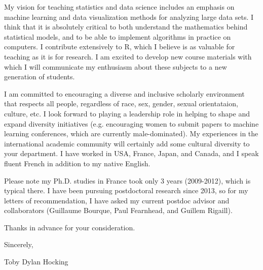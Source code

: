 \documentclass{article}
\begin{document}
My vision for teaching 
statistics 
and data science
includes an emphasis on machine
learning and data visualization methods for analyzing large data
sets. I think that it is absolutely critical to both understand the
mathematics behind statistical models, and to be able to implement
algorithms in practice on computers. I contribute extensively to R,
which I believe is as valuable for teaching as it is for research. I
am excited to develop new course materials with which I will
communicate my enthusiasm about these subjects to a new generation of
students.

I am committed to encouraging a diverse and inclusive scholarly
environment that respects all people, regardless of race, sex, gender,
sexual orientataion, culture, etc. I look forward to playing a
leadership role in helping to shape and expand diversity initiatives
(e.g. encouraging women to submit papers to machine learning
conferences, which are currently male-dominated). My experiences in
the international academic community will certainly add some cultural
diversity to your department. I have worked in USA, France, Japan, and
Canada, and I speak fluent French in addition to my native English. 


Please note my Ph.D. studies in France took only 3
years (2009-2012), which is typical there.
I have been pursuing postdoctoral research since 2013, so for my
letters of recommendation, I have asked my current postdoc advisor and
collaborators (Guillaume Bourque, Paul Fearnhead, and Guillem
Rigaill). 

Thanks in advance for your consideration.

Sincerely,


Toby Dylan Hocking


\end{document}
